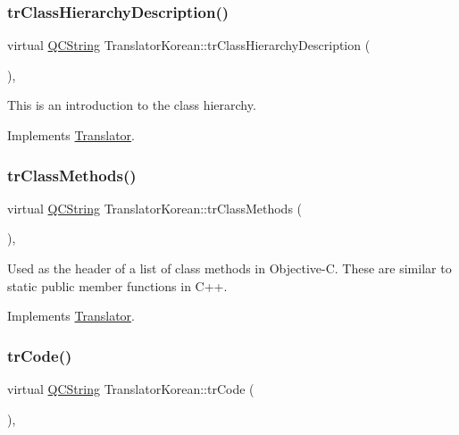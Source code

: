 \subsubsection{\texorpdfstring{trClassHierarchyDescription()}{trClassHierarchyDescription()}}
{\footnotesize\ttfamily virtual \mbox{\hyperlink{class_q_c_string}{Q\+C\+String}} Translator\+Korean\+::tr\+Class\+Hierarchy\+Description (\begin{DoxyParamCaption}{ }\end{DoxyParamCaption})\hspace{0.3cm}{\ttfamily [inline]}, {\ttfamily [virtual]}}

This is an introduction to the class hierarchy. 

Implements \mbox{\hyperlink{class_translator}{Translator}}.

\mbox{\label{class_translator_korean_a7f125d37850a9fe95e285dbce3ace5b3}} 
\subsubsection{\texorpdfstring{trClassMethods()}{trClassMethods()}}
{\footnotesize\ttfamily virtual \mbox{\hyperlink{class_q_c_string}{Q\+C\+String}} Translator\+Korean\+::tr\+Class\+Methods (\begin{DoxyParamCaption}{ }\end{DoxyParamCaption})\hspace{0.3cm}{\ttfamily [inline]}, {\ttfamily [virtual]}}

Used as the header of a list of class methods in Objective-\/C. These are similar to static public member functions in C++. 

Implements \mbox{\hyperlink{class_translator}{Translator}}.

\mbox{\label{class_translator_korean_af840cab56e4173f7313d77d5309ae0ee}} 
\subsubsection{\texorpdfstring{trCode()}{trCode()}}
{\footnotesize\ttfamily virtual \mbox{\hyperlink{class_q_c_string}{Q\+C\+String}} Translator\+Korean\+::tr\+Code (\begin{DoxyParamCaption}{ }\end{DoxyParamCaption})\hspace{0.3cm}{\ttfamily [inline]}, {\ttfamily [virtual]}}

